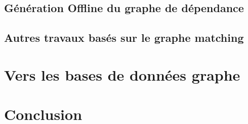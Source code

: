   \subsection{Génération Offline du graphe de dépendance}
  \label{sec:gener-offl-du}

  \subsection{Autres travaux basés sur le graphe matching}
  \label{sec:autres-travaux}

\section{Vers les bases de données graphe}
\label{sec:vers-les-bases}

\section{Conclusion}
\label{sec:conclusion-2}



